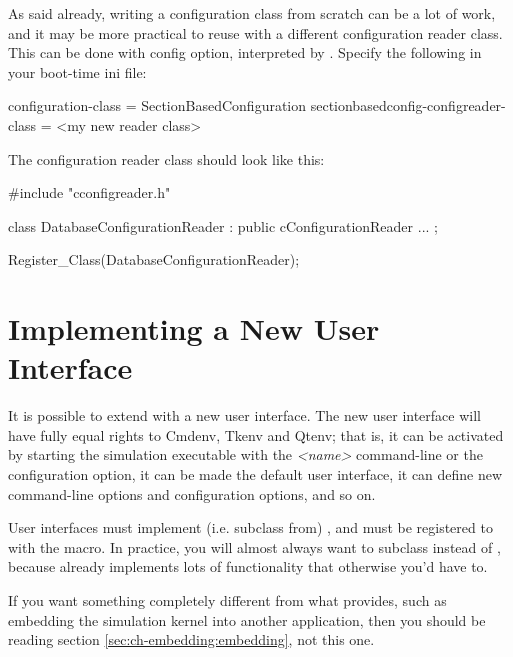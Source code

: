 As said already, writing a configuration class from scratch can
be a lot of work, and it may be more practical to reuse
 with a different configuration
reader class. This can be done with 
config option, interpreted by .
Specify the following in your boot-time ini file:

\begin{inifile}
[General]
configuration-class = SectionBasedConfiguration
sectionbasedconfig-configreader-class = <my new reader class>
\end{inifile}

The configuration reader class should look like this:

\begin{cpp}
#include "cconfigreader.h"

class DatabaseConfigurationReader : public cConfigurationReader
{
   ...
};

Register_Class(DatabaseConfigurationReader);
\end{cpp}


\section{Implementing a New User Interface}
\label{sec:plugin-exts:userinterface}

It is possible to extend {\opp} with a new user interface. The new
user interface will have fully equal rights to Cmdenv, Tkenv and Qtenv;
that is, it can be activated by starting the simulation executable with the
 \textit{<name>} command-line or the 
configuration option, it can be made the default user interface,
it can define new command-line options and configuration options,
and so on.

User interfaces must implement (i.e. subclass from) ,
and must be registered to {\opp} with the  macro.
In practice, you will almost always want to subclass 
instead of , because  already
implements lots of functionality that otherwise you'd have to.

\begin{note}
If you want something completely different from what 
provides, such as embedding the simulation kernel into another
application, then you should be reading section \ref{sec:ch-embedding:embedding},
not this one.
\end{note}

